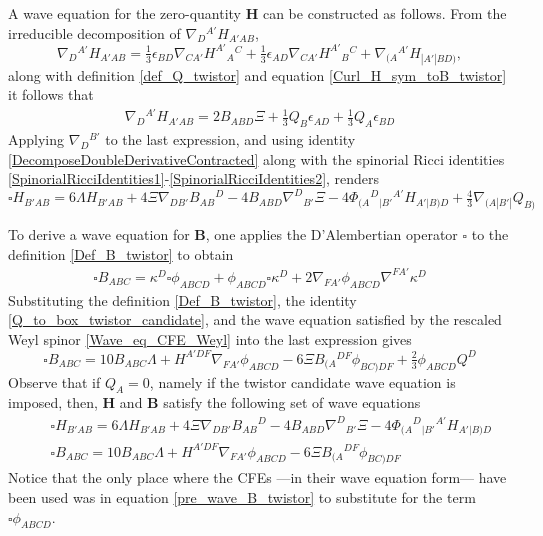 \documentclass[10pt,a4paper]{article}
\theoremstyle{plain}
\def\bmB{{\bm B}}
\def\bmH{{\bm H}}
\begin{document}
A wave equation for the zero-quantity $\bmH$ can be constructed as
follows.  From the irreducible decomposition of
$\nabla_D{}^{A'}H_{A'AB}$,
\[
\nabla_{D}{}^{A'}H_{A'AB} = \tfrac{1}{3} \epsilon _{BD}
\nabla_{CA'}H^{A'}{}_{A}{}^{C} + \tfrac{1}{3} \epsilon _{AD}
\nabla_{CA'}H^{A'}{}_{B}{}^{C} + \nabla_{(A}{}^{A'}H_{|A'|BD)},
\]
 along with definition \eqref{def_Q_twistor} and equation
\eqref{Curl_H_sym_toB_twistor} it follows that
\begin{align}\label{derH_twistor_toBandQ}
\nabla_{D}{}^{A'}H_{A'AB} = 2 B_{ABD} \Xi + \tfrac{1}{3} Q_{B}
\epsilon _{AD} + \tfrac{1}{3} Q_{A} \epsilon _{BD}
\end{align}
Applying $\nabla_{D}{}^{B'}$ to the last expression, and using
identity \eqref{DecomposeDoubleDerivativeContracted} along with the
spinorial Ricci identities
\eqref{SpinorialRicciIdentities1}-\eqref{SpinorialRicciIdentities2},
renders
\begin{equation}\label{wave_H_twistor}
  \square H_{B'AB} = 6 \Lambda H_{B'AB} + 4 \Xi
  \nabla_{DB'}B_{AB}{}^{D} -4 B_{ABD} \nabla^{D}{}_{B'}\Xi -4
  \Phi_{(A}{}^{D}{}_{|B'}{}^{A'}H_{A'|B)D} + \tfrac{4}{3}
  \nabla_{(A|B'|}Q_{B)}
\end{equation}

\noindent To derive a wave equation for $\bmB$, one applies the D'Alembertian operator
$\square$ to the definition \eqref{Def_B_twistor} to obtain
\begin{align}\label{pre_wave_B_twistor}
\square B_{ABC} = \kappa ^{D} \square \phi _{ABCD} + \phi _{ABCD}
\square \kappa ^{D} + 2 \nabla_{FA'}\phi _{ABCD} \nabla^{FA'}\kappa
^{D}
\end{align}
Substituting the definition \eqref{Def_B_twistor}, the identity
\eqref{Q_to_box_twistor_candidate}, and the wave equation satisfied by
the rescaled Weyl spinor \eqref{Wave_eq_CFE_Weyl} into the last expression gives
\begin{equation}\label{wave_B_twistor}
\square B_{ABC} = 10 B_{ABC} \Lambda + H^{A'DF} \nabla_{FA'}\phi _{ABCD}  -6 \Xi B_{(A}{}^{DF}\phi
_{BC)DF} + \tfrac{2}{3} \phi _{ABCD} Q^{D}
\end{equation}
Observe that if $Q_{A}=0$, namely if the twistor candidate wave equation is imposed, then,
$\bmH$ and $\bmB$ satisfy the following set of wave equations
\begin{subequations}
\begin{eqnarray}
  && \square H_{B'AB} = 6 \Lambda H_{B'AB} + 4 \Xi
  \nabla_{DB'}B_{AB}{}^{D}  -4 B_{ABD} \nabla^{D}{}_{B'}\Xi   -4 \Phi_{(A}{}^{D}{}_{|B'}{}^{A'}H_{A'|B)D}
   \label{Hom_wave_HandB1} \\
 && \square B_{ABC} = 10 B_{ABC} \Lambda + H^{A'DF} \nabla_{FA'}\phi _{ABCD}  -6 \Xi B_{(A}{}^{DF}\phi
_{BC)DF}  \label{Hom_wave_HandB2}
\end{eqnarray}
\end{subequations}
Notice that the only place where the CFEs ---in their wave equation form---
have been used was in equation \eqref{pre_wave_B_twistor}
to substitute for the term $\square \phi _{ABCD}$.
\end{document}
